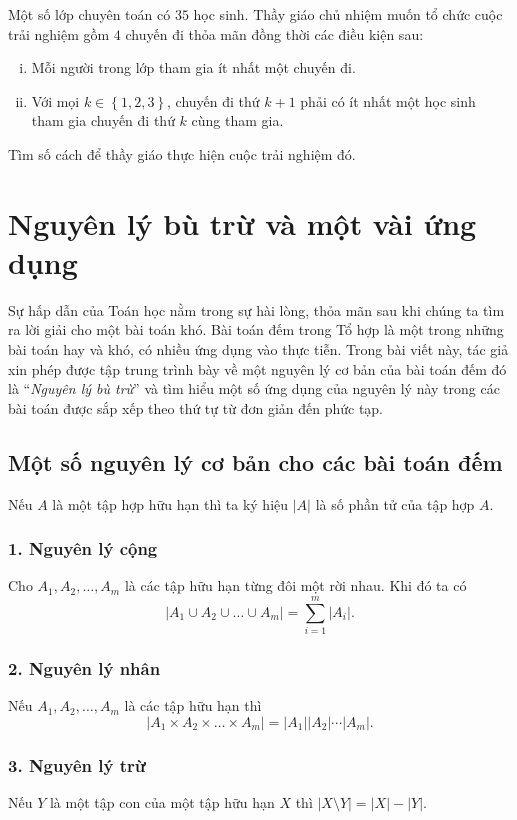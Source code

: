 \begin{bt}[Hà Tĩnh 2017]
 Một số lớp chuyên toán có $35$ học sinh. Thầy giáo chủ nhiệm muốn tổ chức cuộc trải nghiệm gồm $4$ chuyến đi thỏa mãn đồng thời các điều kiện sau: 
 \begin{enumerate}[i)]
 	\item Mỗi người trong lớp tham gia ít nhất một chuyến đi. 
 	\item Với mọi $k \in \left\{1,2,3\right\}$, chuyến đi thứ $k+1$ phải có ít nhất một học sinh tham gia chuyến đi thứ $k$ cùng tham gia.
 \end{enumerate}
 Tìm số cách để thầy giáo thực hiện cuộc trải nghiệm đó. 
\end{bt}



\section{Nguyên lý bù trừ và một vài ứng dụng}
Sự hấp dẫn của Toán học nằm trong sự hài lòng, thỏa mãn sau khi chúng ta tìm ra lời giải cho một bài toán khó. Bài toán đếm trong Tổ hợp là một trong những bài toán hay và khó, có nhiều ứng dụng vào thực tiễn. Trong bài viết này, tác giả xin phép được tập trung trình bày về một nguyên lý cơ bản của bài toán đếm đó là ``\textit{Nguyên lý bù trừ}'' và tìm hiểu một số ứng dụng của nguyên lý này trong các bài toán được sắp xếp theo thứ tự từ đơn giản đến phức tạp.


\subsection{Một số nguyên lý cơ bản cho các bài toán đếm}
\setcounter{bt}{0}
\noindent Nếu $A$ là một tập hợp hữu hạn thì ta ký hiệu $|A|$ là số phần tử của tập hợp $A$.
\subsubsection{1. Nguyên lý cộng}
 Cho $A_1, A_2, \dots, A_m$ là các tập hữu hạn từng đôi một rời nhau. Khi đó ta có \[ |A_1 \cup A_2 \cup \dots \cup A_m| = \sum \limits_{i=1}^{m}|A_i|.\]
\subsubsection{2. Nguyên lý nhân}
 Nếu $A_1,A_2,\dots, A_m$ là các tập hữu hạn thì \[|A_1 \times A_2 \times \dots \times A_m| = |A_1||A_2|\cdots |A_m|.\]
\subsubsection{3. Nguyên lý trừ}
Nếu $Y$ là một tập con của một tập hữu hạn $X$ thì $|X\setminus Y| = |X| - |Y|$.
